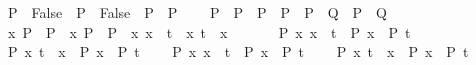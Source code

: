 \begin{isabellebody}
\ \ \ \ {\isachardoublequoteopen}{\isacharparenleft}{\kern0pt}P\ {\isasymor}\ False{\isacharparenright}{\kern0pt}\ {\isacharequal}{\kern0pt}\ P{\isachardoublequoteclose}\ \ {\isachardoublequoteopen}{\isacharparenleft}{\kern0pt}False\ {\isasymor}\ P{\isacharparenright}{\kern0pt}\ {\isacharequal}{\kern0pt}\ P{\isachardoublequoteclose}\isanewline
\ \ \ \ {\isachardoublequoteopen}{\isacharparenleft}{\kern0pt}P\ {\isasymor}\ P{\isacharparenright}{\kern0pt}\ {\isacharequal}{\kern0pt}\ P{\isachardoublequoteclose}\ \ {\isachardoublequoteopen}{\isacharparenleft}{\kern0pt}P\ {\isasymor}\ {\isacharparenleft}{\kern0pt}P\ {\isasymor}\ Q{\isacharparenright}{\kern0pt}{\isacharparenright}{\kern0pt}\ {\isacharequal}{\kern0pt}\ {\isacharparenleft}{\kern0pt}P\ {\isasymor}\ Q{\isacharparenright}{\kern0pt}{\isachardoublequoteclose}\ \isanewline
\ \ \ \ {\isachardoublequoteopen}{\isacharparenleft}{\kern0pt}{\isasymforall}x{\isachardot}{\kern0pt}\ P{\isacharparenright}{\kern0pt}\ {\isacharequal}{\kern0pt}\ P{\isachardoublequoteclose}\ \ {\isachardoublequoteopen}{\isacharparenleft}{\kern0pt}{\isasymexists}x{\isachardot}{\kern0pt}\ P{\isacharparenright}{\kern0pt}\ {\isacharequal}{\kern0pt}\ P{\isachardoublequoteclose}\ \ {\isachardoublequoteopen}{\isasymexists}x{\isachardot}{\kern0pt}\ x\ {\isacharequal}{\kern0pt}\ t{\isachardoublequoteclose}\ \ {\isachardoublequoteopen}{\isasymexists}x{\isachardot}{\kern0pt}\ t\ {\isacharequal}{\kern0pt}\ x{\isachardoublequoteclose}\isanewline
\ \ \isanewline
\ \ \ \ {\isachardoublequoteopen}{\isasymAnd}P{\isachardot}{\kern0pt}\ {\isacharparenleft}{\kern0pt}{\isasymexists}x{\isachardot}{\kern0pt}\ x\ {\isacharequal}{\kern0pt}\ t\ {\isasymand}\ P\ x{\isacharparenright}{\kern0pt}\ {\isacharequal}{\kern0pt}\ P\ t{\isachardoublequoteclose}\isanewline
\ \ \ \ {\isachardoublequoteopen}{\isasymAnd}P{\isachardot}{\kern0pt}\ {\isacharparenleft}{\kern0pt}{\isasymexists}x{\isachardot}{\kern0pt}\ t\ {\isacharequal}{\kern0pt}\ x\ {\isasymand}\ P\ x{\isacharparenright}{\kern0pt}\ {\isacharequal}{\kern0pt}\ P\ t{\isachardoublequoteclose}\isanewline
\ \ \ \ {\isachardoublequoteopen}{\isasymAnd}P{\isachardot}{\kern0pt}\ {\isacharparenleft}{\kern0pt}{\isasymforall}x{\isachardot}{\kern0pt}\ x\ {\isacharequal}{\kern0pt}\ t\ {\isasymlongrightarrow}\ P\ x{\isacharparenright}{\kern0pt}\ {\isacharequal}{\kern0pt}\ P\ t{\isachardoublequoteclose}\isanewline
\ \ \ \ {\isachardoublequoteopen}{\isasymAnd}P{\isachardot}{\kern0pt}\ {\isacharparenleft}{\kern0pt}{\isasymforall}x{\isachardot}{\kern0pt}\ t\ {\isacharequal}{\kern0pt}\ x\ {\isasymlongrightarrow}\ P\ x{\isacharparenright}{\kern0pt}\ {\isacharequal}{\kern0pt}\ P\ t{\isachardoublequoteclose}\isanewline

\end{isabellebody}
